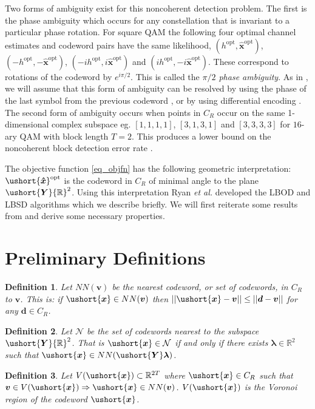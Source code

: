 \documentclass[conference]{IEEEtran}
\newtheorem{definition}{Definition}
\newcommand{\reals}{{\mathbb R}}
\newcommand{\uY}{\ushort{\bm{Y}}}
\newcommand{\ux}{\ushort{\bm{x}}}
\newcommand{\uhx}{\ushort{\bm{\hat{x}}}}
\begin{document}
Two forms of ambiguity exist for this noncoherent detection problem.  The first is
the phase ambiguity which occurs for any constellation that is invariant to a particular phase rotation.  For square QAM the following four optimal channel estimates and codeword pairs have the same likelihood, $(h^{\text{opt}}, \bm{\hat{x}}^{\text{opt}})$, $(-h^{\text{opt}}, -\bm{\hat{x}}^{\text{opt}})$, $(-ih^{\text{opt}}, i\bm{\hat{x}}^{\text{opt}})$ and $(ih^{\text{opt}}, -i\bm{\hat{x}}^{\text{opt}})$.  These correspond to rotations of the codeword by $e^{i\pi/2}$.  This is called the \emph{$\pi/2$ phase ambiguity}.  As in \cite{Ryan2007}, we will assume that this form of ambiguity can be resolved by using the phase of the last symbol from the previous codeword \cite{Chen2003,Warrier2002}, or by using differential encoding \cite{Weber1978}.  The second form of ambiguity occurs when points in $C_R$  occur on the same 1-dimensional complex subspace eg. $[1,1,1,1]$, $[3,1,3,1]$ and $[3,3,3,3]$ for $16$-ary QAM with block length $T=2$.  This produces a lower bound on the noncoherent block detection error rate \cite{Ryan2006}.

The objective function \eqref{eq_objfn} has the following geometric interpretation: $\uhx^{\text{opt}}$ is the codeword in $C_R$ of minimal angle to the plane $\uY \reals^2$.  Using this interpretation Ryan \emph{et al.} developed the LBOD and LBSD algorithms which we describe briefly.  We will first reiterate some results from \cite{Ryan2007} and derive some necessary properties.


\section{Preliminary Definitions} \label{prelim_defns}

\begin{definition}
Let $NN(\bm{v})$ be the nearest codeword, or set of codewords, in $C_R$ to $\bm{v}$.  This is: if $\ux \in NN(\bm{v})$ then $||\ux - \bm{v}|| \leq ||\bm{d}-\bm{v}||$ for any $\bm{d} \in C_R$.
\end{definition}

\begin{definition} \label{ncr}
Let ${\mathcal N}$ be the set of codewords nearest to the subspace $\uY \reals^2$.  That is $\ux \in {\mathcal N}$ if and only if there exists $\bm{\lambda} \in \reals^2$ such that $\ux \in NN(\uY\bm{\lambda})$.
\end{definition}

\begin{definition} \label{V}
Let $V(\ux) \subset \reals^{2T}$ where $\ux \in C_R$ such that $\bm{v} \in V(\ux) \Rightarrow \ux \in NN(\bm{v})$.  $V(\ux)$ is the Voronoi region of the codeword $\ux$.
\end{definition}
\end{document}
